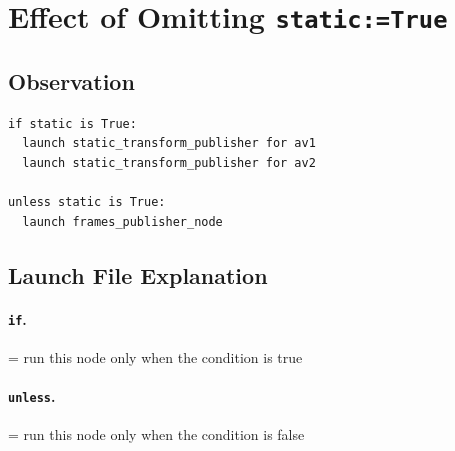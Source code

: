 \documentclass[11pt]{article}
\newcommand{\cmd}[1]{\texttt{#1}}
\begin{document}
\section{Effect of Omitting \cmd{static:=True}}

\subsection*{Observation}
\begin{verbatim}
if static is True:
  launch static_transform_publisher for av1
  launch static_transform_publisher for av2

unless static is True:
  launch frames_publisher_node
\end{verbatim}

\subsection*{Launch File Explanation}

\paragraph{\cmd{if}.}
= run this node only when the condition is true


\paragraph{\cmd{unless}.}
= run this node only when the condition is false
\end{document}
